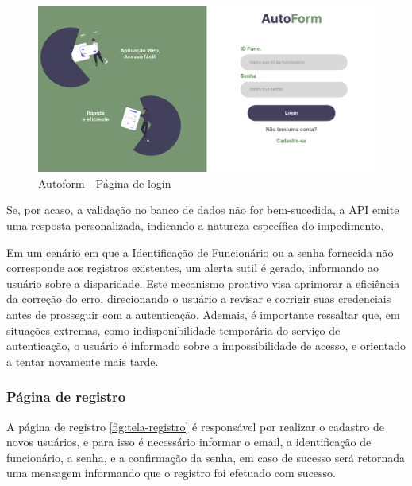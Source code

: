 \begin{figure}[htb]
    \caption{\label{fig:tela-login}Autoform - Página de login}
    \begin{center}
        \includegraphics[scale=0.5]{imagens/login-autoform.png}
    \end{center}
\end{figure}

 Se, por acaso, a validação no banco de dados não for bem-sucedida, a API emite uma resposta personalizada, indicando a natureza específica do impedimento.

Em um cenário em que a Identificação de Funcionário ou a senha fornecida não corresponde aos registros existentes, um alerta sutil é gerado, informando ao usuário sobre a disparidade. Este mecanismo proativo visa aprimorar a eficiência da correção do erro, direcionando o usuário a revisar e corrigir suas credenciais antes de prosseguir com a autenticação.
Ademais, é importante ressaltar que, em situações extremas, como indisponibilidade temporária do serviço de autenticação, o usuário é informado sobre a impossibilidade de acesso, e orientado a tentar novamente mais tarde.

\subsubsection{Página de registro}
A página de registro \autoref{fig:tela-registro} é responsável por realizar o cadastro de novos usuários, e para isso é necessário informar o email, a identificação de funcionário, a senha, e a confirmação da senha, em caso de sucesso será retornada uma mensagem informando que o registro foi efetuado com sucesso.

